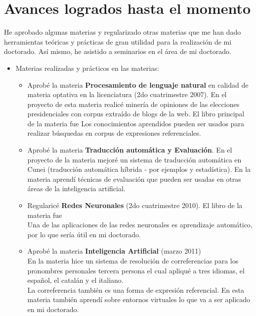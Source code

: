 \section{Avances logrados hasta el momento}
\label{progreso}

He aprobado algunas materias y regularizado otras materias que me han dado herramientas te\'oricas y pr\'acticas de gran utilidad para la realizaci\'on de mi doctorado. As\'i mismo, he asistido a seminarios en el \'area de mi doctorado.

\begin{itemize}

\item Materias realizadas y pr\'acticos en las materias:\\

\begin{itemize}
\item Aprob\'e la materia {\bf Procesamiento de lenguaje natural} en calidad de materia optativa en la licenciatura (2do cuatrimestre 2007). En el proyecto de esta materia realic\'e miner\'ia de opiniones de las elecciones presidenciales con corpus extra\'ido de blogs de la web. El libro principal de la materia fue \cite{Manning2000}
Los conocimientos aprendidos pueden ser usados para realizar b\'usquedas en corpus de expresiones referenciales.
\item Aprob\'e la materia {\bf Traducci\'on autom\'atica y Evaluaci\'on}. En el proyecto de la materia mejor\'e un sistema de traducci\'on autom\'atica en Cunei (traducci\'on autom\'atica h\'ibrida - por ejemplos y estad\'istica).
En la materia aprend\'i t\'ecnicas de evaluaci\'on que pueden ser usadas en otras \'areas de la inteligencia artificial. 
\item Regularic\'e {\bf Redes Neuronales} (2do cuatrimestre 2010). El libro de la materia fue \cite{Hertz1991}\\
Una de las aplicaciones de las redes neuronales es aprendizaje autom\'atico, por lo que ser\'ia \'util en mi doctorado.
\item Aprob\'e la materia {\bf Inteligencia Artificial} (marzo 2011)\\
En la materia hice un sistema de resoluci\'on de correferencias para los pronombres personales tercera persona el cual apliqu\'e a tres idiomas, el espa\~{n}ol, el catal\'an y el italiano.\\
La correferencia tambi\'en es una forma de expresi\'on referencial. En esta materia tambi\'en aprend\'i sobre entornos virtuales lo que va a ser aplicado en mi doctorado.

\end{itemize}
\end{itemize}
